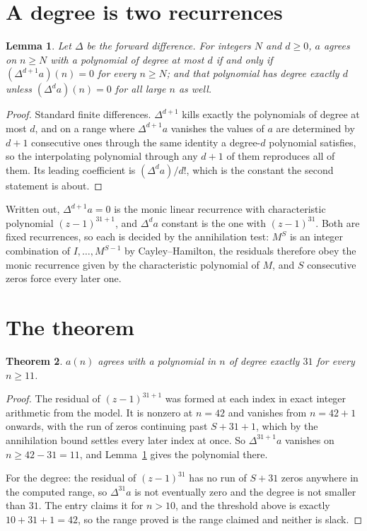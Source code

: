 \documentclass[11pt,a4paper]{article}
\theoremstyle{plain}
\newtheorem{theorem}{Theorem}
\newtheorem{lemma}[theorem]{Lemma}
\theoremstyle{definition}
\begin{document}
\section{A degree is two recurrences}

\begin{lemma}\label{lem:diff}
Let $\Delta$ be the forward difference. For integers $N$ and $d\ge0$, $a$ agrees on
$n\ge N$ with a polynomial of degree at most $d$ if and only if $(\Delta^{d+1}a)(n)=0$ for
every $n\ge N$; and that polynomial has degree exactly $d$ unless $(\Delta^{d}a)(n)=0$ for
all large $n$ as well.
\end{lemma}

\begin{proof}
Standard finite differences. $\Delta^{d+1}$ kills exactly the polynomials of degree at most
$d$, and on a range where $\Delta^{d+1}a$ vanishes the values of $a$ are determined by
$d+1$ consecutive ones through the same identity a degree-$d$ polynomial satisfies, so the
interpolating polynomial through any $d+1$ of them reproduces all of them. Its leading
coefficient is $(\Delta^{d}a)/d!$, which is the constant the second statement is about.
\end{proof}

Written out, $\Delta^{d+1}a=0$ is the monic linear recurrence with characteristic polynomial
$(z-1)^{31+1}$, and $\Delta^{d}a$ constant is the one with $(z-1)^{31}$. Both are
fixed recurrences, so each is decided by the annihilation test: $M^{S}$ is an integer
combination of $I,\dots,M^{S-1}$ by Cayley--Hamilton, the residuals therefore obey the monic
recurrence given by the characteristic polynomial of $M$, and $S$ consecutive zeros force every
later one.

\section{The theorem}

\begin{theorem}
$a(n)$ agrees with a polynomial in $n$ of degree exactly $31$ for every $n\ge11$.
\end{theorem}

\begin{proof}
The residual of $(z-1)^{31+1}$ was formed at each index in exact integer arithmetic from
the model. It is nonzero at $n=42$ and vanishes from $n=42+1$ onwards, with the run of
zeros continuing past $S+31+1$, which by the annihilation bound settles every later index at
once. So $\Delta^{31+1}a$ vanishes on $n\ge42-31=11$, and
Lemma~\ref{lem:diff} gives the polynomial there.

For the degree: the residual of $(z-1)^{31}$ has no run of $S+31$ zeros anywhere in the
computed range, so $\Delta^{31}a$ is not eventually zero and the degree is not smaller
than $31$. The entry claims it for $n>10$, and the threshold above is exactly $10+31+1=42$, so the range proved is the range claimed and neither is slack.
\end{proof}
\end{document}
